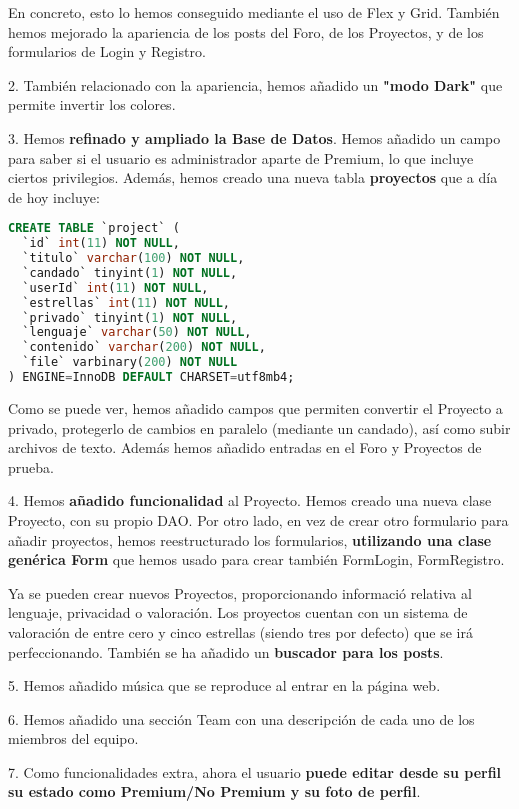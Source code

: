 \documentclass[12pt]{report}
\begin{document}
En concreto, esto lo hemos conseguido mediante el uso de Flex y Grid. También hemos mejorado la apariencia de los posts del Foro, de los Proyectos, y de los formularios de Login y Registro.

2. También relacionado con la apariencia, hemos añadido un \textbf{"modo Dark"} que permite invertir los colores.

3. Hemos \textbf{refinado y ampliado la Base de Datos}. Hemos añadido un campo para saber si el usuario es administrador aparte de Premium, lo que incluye ciertos privilegios. Además, hemos creado una nueva tabla \textbf{proyectos} que a día de hoy incluye:
\newline
\begin{lstlisting}[language=SQL]
CREATE TABLE `project` (
  `id` int(11) NOT NULL,
  `titulo` varchar(100) NOT NULL,
  `candado` tinyint(1) NOT NULL,
  `userId` int(11) NOT NULL,
  `estrellas` int(11) NOT NULL,
  `privado` tinyint(1) NOT NULL,
  `lenguaje` varchar(50) NOT NULL,
  `contenido` varchar(200) NOT NULL,
  `file` varbinary(200) NOT NULL
) ENGINE=InnoDB DEFAULT CHARSET=utf8mb4;
\end{lstlisting}
Como se puede ver, hemos añadido campos que permiten convertir el Proyecto a privado, protegerlo de cambios en paralelo (mediante un candado), así como subir archivos de texto. Además hemos añadido entradas en el Foro y Proyectos de prueba.

4. Hemos \textbf{añadido funcionalidad} al Proyecto. Hemos creado una nueva clase Proyecto, con su propio DAO. Por otro lado, en vez de crear otro formulario para añadir proyectos, hemos reestructurado los formularios, \textbf{utilizando una clase genérica Form} que hemos usado para crear también FormLogin, FormRegistro. 

Ya se pueden crear nuevos Proyectos, proporcionando informació relativa al lenguaje, privacidad o valoración. Los proyectos cuentan con un sistema de valoración de entre cero y cinco estrellas (siendo tres por defecto) que se irá perfeccionando. También se ha añadido un \textbf{buscador para los posts}.

5. Hemos añadido música que se reproduce al entrar en la página web.

6. Hemos añadido una sección Team con una descripción de cada uno de los miembros del equipo.

7. Como funcionalidades extra, ahora el usuario \textbf{puede editar desde su perfil su estado como Premium/No Premium y su foto de perfil}.
\end{document}
